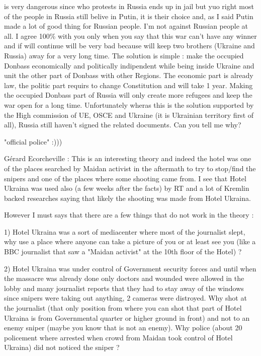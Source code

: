 \begin{itemize}
\begin{itemize}
is very dangerous since who protests in Russia ends up in jail but yuo right
most of the people in Russia still belive in Putin, it is their choice and, as
I said Putin made a lot of good thing for Russian people. I'm not against
Russian people at all. I agree 100\% with you only when you say that this war
can't have any winner and if will continue will be very bad because will keep
two brothers (Ukraine and Russia) away for a very long time. The solution is
simple : make the occupied Donbass economically and politically indipendent
while being inside Ukraine and unit the other part of Donbass with other
Regions. The economic part is already law, the politic part requirs to change
Constitution and will take 1 year. Making the occupied Donbass part of Russia
will only create more refugees and keep the war open for a long time.
Unfortunately wheras this is the solution supported by the High commission of
UE, OSCE and Ukraine (it is Ukrainian territory first of all), Russia still
haven't signed the related documents. Can you tell me why?  


"official police" :)))


Gérard Ecorcheville : This is an interesting theory and indeed the hotel was
one of the places searched by Maidan activist in the aftermath to try to
stop/find the snipers and one of the places where some shooting came from. I
see that Hotel Ukraina was used also (a few weeks after the facts) by RT and a
lot of Kremlin backed researches saying that likely the shooting was made from
Hotel Ukraina. 

However I must says that there are a few things that do not work in the theory
: 

1) Hotel Ukraina was a sort of mediacenter where most of the journalist slept,
why use a place where anyone can take a picture of you or at least see you
(like a BBC journalist that saw a "Maidan activist" at the 10th floor of the
Hotel) ? 

2) Hotel Ukraina was under control of Government security forces and until when
the massacre was already done only doctors and wounded were allowed in the
lobby and many journalist reports that they had to stay away of the windows
since snipers were taking out anything, 2 cameras were distroyed. Why shot at
the journalist (that only position from where you can shot that part of Hotel
Ukraina is from Governmental quarter or higher ground in front) and not to an
enemy sniper (maybe you know that is not an enemy). 
Why police (about 20 policement where arrested when crowd from Maidan took
control of Hotel Ukraina) did not noticed the sniper ? 


\end{itemize}
\end{itemize}
